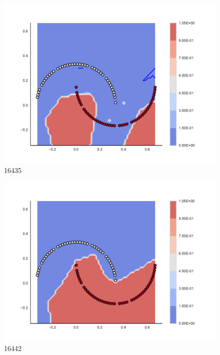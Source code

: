 \begin{subfigure}[b]{0.12\textwidth}
    \includegraphics[clip, trim=2.35cm 1.75cm 4.5cm 0cm,width=\textwidth]{img/convergence/16435.pdf}
    \caption{16435}
    \label{fig:convergence_16435}
\end{subfigure}
%
\begin{subfigure}[b]{0.12\textwidth}
    \includegraphics[clip, trim=2.35cm 1.75cm 4.5cm 0cm,width=\textwidth]{img/convergence/16442.pdf}
    \caption{16442}
    \label{fig:convergence_16442}
\end{subfigure}
%
